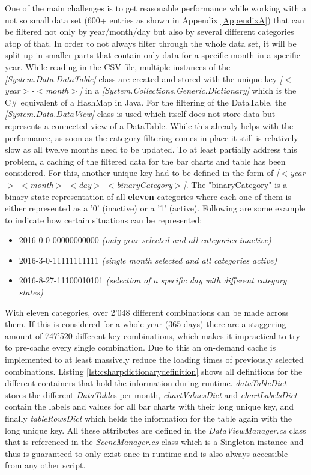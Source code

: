 One of the main challenges is to get reasonable performance while working with a not so small data set (600+ entries as shown in Appendix \ref{AppendixA}) that can be filtered not only by year/month/day but also by several different categories atop of that. In order to not always filter through the whole data set, it will be split up in smaller parts that contain only data for a specific month in a specific year. While reading in the CSV file, multiple instances of the \textit{[System.Data.DataTable]} class are created and stored with the unique key \textit{[$<$year$>$-$<$month$>$]} in a \textit{[System.Collections.Generic.Dictionary]} which is the C\# equivalent of a HashMap in Java. For the filtering of the DataTable, the \textit{[System.Data.DataView]} class is used which itself does not store data but represents a connected view of a DataTable. While this already helps with the performance, as soon as the category filtering comes in place it still is relatively slow as all twelve months need to be updated. \newline
To at least partially address this problem, a caching of the filtered data for the bar charts and table has been considered. For this, another unique key had to be defined in the form of \textit{[$<$year$>$-$<$month$>$-$<$day$>$-$<$binaryCategory$>$]}. The "binaryCategory" is a binary state representation of all \textbf{eleven} categories where each one of them is either represented as a '0' (inactive) or a '1' (active). Following are some example to indicate how certain situations can be represented:
\begin{itemize}[noitemsep,nolistsep]
	\item 2016-0-0-00000000000 \textit{(only year selected and all categories inactive)}
	\item 2016-3-0-11111111111 \textit{(single month selected and all categories active)}
	\item 2016-8-27-11100010101 \textit{(selection of a specific day with different category states)}
\end{itemize}
With eleven categories, over 2'048 different combinations can be made across them. If this is considered for a whole year (365 days) there are a staggering amount of 747'520 different key-combinations, which makes it impractical to try to pre-cache every single combination. Due to this an on-demand cache is implemented to at least massively reduce the loading times of previously selected combinations. Listing \ref{lst:csharpdictionarydefinition} shows all definitions for the different containers that hold the information during runtime. \textit{dataTableDict} stores the different \textit{DataTable}s per month, \textit{chartValuesDict} and \textit{chartLabelsDict} contain the labels and values for all bar charts with their long unique key, and finally \textit{tableRowsDict} which helds the information for the table again with the long unique key. All these attributes are defined in the \textit{DataViewManager.cs} class that is referenced in the \textit{SceneManager.cs} class which is a Singleton instance and thus is guaranteed to only exist once in runtime and is also always accessible from any other script.
